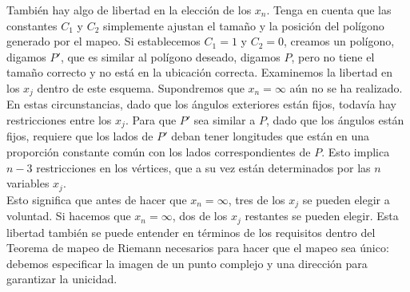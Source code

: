 También hay algo de libertad en la elección de los $x_n$. Tenga en cuenta que las constantes $C_1$ y $C_2$ simplemente ajustan el tamaño y la posición del polígono generado por el mapeo. Si establecemos $C_1 = 1 $ y $C_2 = 0$, creamos un polígono, digamos $P'$, que es similar al polígono deseado, digamos $P$, pero no tiene el tamaño correcto y no está en la ubicación correcta. Examinemos la libertad en los $x_j$ dentro de este esquema. Supondremos que $x_n = \infty$ aún no se ha realizado. En estas circunstancias, dado que los ángulos exteriores están fijos, todavía hay restricciones entre los $x_j$. Para que $P'$ sea similar a $P$, dado que los ángulos están fijos, requiere que los lados de $P'$ deban tener longitudes que están en una proporción constante común con los lados correspondientes de $P$. Esto implica $n - 3$ restricciones en los vértices, que a su vez están determinados por las $n$ variables $x_j$.\\
Esto significa que antes de hacer que $x_n = \infty$, tres de los $x_j$ se pueden elegir a voluntad. Si hacemos que $x_n = \infty$, dos de los $x_j$ restantes se pueden elegir. Esta libertad también se puede entender en términos de los requisitos dentro del Teorema de mapeo de Riemann necesarios para hacer que el mapeo sea único: debemos especificar la imagen de un punto complejo  y una dirección para garantizar la unicidad.

